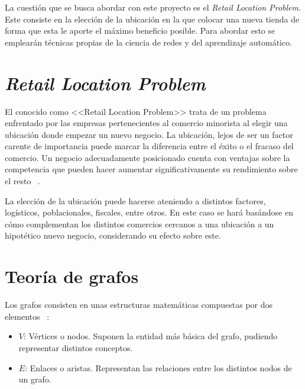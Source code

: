 
La cuestión que se busca abordar con este proyecto es el \textit{Retail Location Problem}. Este consiste
en la elección de la ubicación en la que colocar una nueva tienda de forma que esta le aporte el máximo beneficio posible. Para abordar esto se emplearán técnicas propias de la ciencia de redes y del aprendizaje automático.

\section{\textit{Retail Location Problem}}

El conocido como <<Retail Location Problem>> trata de un problema enfrentado por las empresas pertenecientes al comercio minorista al elegir una ubicación donde empezar un nuevo negocio. La ubicación, lejos de ser un factor carente de importancia puede marcar la diferencia entre el éxito o el fracaso del comercio. Un negocio adecuadamente posicionado cuenta con ventajas sobre la competencia que pueden hacer aumentar significativamente su rendimiento sobre el resto ~\cite{Ahedo2021, RSVAJSSHJG}.

La elección de la ubicación puede hacerse ateniendo a distintos factores, logísticos, poblacionales, fiscales, entre otros. En este caso se hará basándose en cómo complementan los distintos comercios cercanos a una ubicación a un hipotético nuevo negocio, considerando su efecto sobre este. 

%


\section{Teoría de grafos}

Los grafos consisten en unas estructuras matemáticas compuestas por dos elementos ~\cite{enwiki:1171835383}:

\begin{itemize}
	\item $V$: Vértices o nodos. Suponen la entidad más básica del grafo, pudiendo representar distintos conceptos.
	\item $E$: Enlaces o aristas. Representan las relaciones entre los distintos nodos de un grafo.
\end{itemize}

